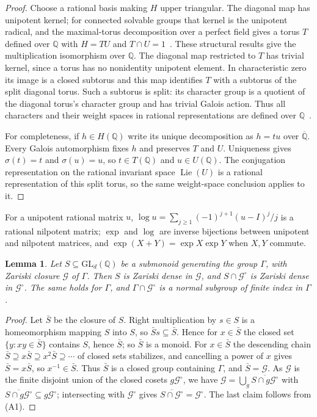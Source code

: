 \documentclass[11pt,letterpaper]{article}
\newcommand{\Q}{\mathbb{Q}}
\newcommand{\Qb}{\overline{\mathbb{Q}}}
\newcommand{\cG}{\mathcal{G}}
\newcommand{\GL}{\mathrm{GL}}
\newtheorem{lemma}[theorem]{Lemma}
\theoremstyle{definition}
\begin{document}
\begin{proof}
Choose a rational basis making $H$ upper triangular. The diagonal map has unipotent kernel; for connected solvable groups that kernel is the unipotent radical, and the maximal-torus decomposition over a perfect field gives a torus $T$ defined over $\Q$ with $H=T U$ and $T\cap U=1$~\cite[Theorems~10.6(1),(4) and~18.2(i)]{Bor91}. These structural results give the multiplication isomorphism over $\Q$. The diagonal map restricted to $T$ has trivial kernel, since a torus has no nonidentity unipotent element. In characteristic zero its image is a closed subtorus and this map identifies $T$ with a subtorus of the split diagonal torus. Such a subtorus is split: its character group is a quotient of the diagonal torus's character group and has trivial Galois action. Thus all characters and their weight spaces in rational representations are defined over $\Q$~\cite[\S8]{Bor91}.

For completeness, if $h\in H(\Q)$ write its unique decomposition as $h=tu$ over $\Qb$. Every Galois automorphism fixes $h$ and preserves $T$ and $U$. Uniqueness gives $\sigma(t)=t$ and $\sigma(u)=u$, so $t\in T(\Q)$ and $u\in U(\Q)$. The conjugation representation on the rational invariant space $\operatorname{Lie}(U)$ is a rational representation of this split torus, so the same weight-space conclusion applies to it.
\end{proof}

For a unipotent rational matrix $u$, $\log u=\sum_{j\ge1}(-1)^{j+1}(u-I)^j/j$ is a rational nilpotent matrix; $\exp$ and $\log$ are inverse bijections between unipotent and nilpotent matrices, and $\exp(X+Y)=\exp X\exp Y$ when $X,Y$ commute.

\begin{lemma}\label{lem:monoid}
Let $S\subseteq\GL_d(\Q)$ be a submonoid generating the group $\Gamma$, with Zariski closure $\cG$ of $\Gamma$. Then $S$ is Zariski dense in $\cG$, and $S\cap\cG^\circ$ is Zariski dense in $\cG^\circ$. The same holds for $\Gamma$, and $\Gamma\cap\cG^\circ$ is a normal subgroup of finite index in $\Gamma$.
\end{lemma}
\begin{proof}
Let $\bar S$ be the closure of $S$. Right multiplication by $s\in S$ is a homeomorphism mapping $S$ into $S$, so $\bar Ss\subseteq\bar S$. Hence for $x\in\bar S$ the closed set $\{y:xy\in\bar S\}$ contains $S$, hence $\bar S$; so $\bar S$ is a monoid. For $x\in\bar S$ the descending chain $\bar S\supseteq x\bar S\supseteq x^2\bar S\supseteq\cdots$ of closed sets stabilizes, and cancelling a power of $x$ gives $\bar S=x\bar S$, so $x^{-1}\in\bar S$. Thus $\bar S$ is a closed group containing $\Gamma$, and $\bar S=\cG$. As $\cG$ is the finite disjoint union of the closed cosets $g\cG^\circ$, we have $\cG=\bigcup_g\overline{S\cap g\cG^\circ}$ with $\overline{S\cap g\cG^\circ}\subseteq g\cG^\circ$; intersecting with $\cG^\circ$ gives $\overline{S\cap\cG^\circ}=\cG^\circ$. The last claim follows from (A1).
\end{proof}
\end{document}
